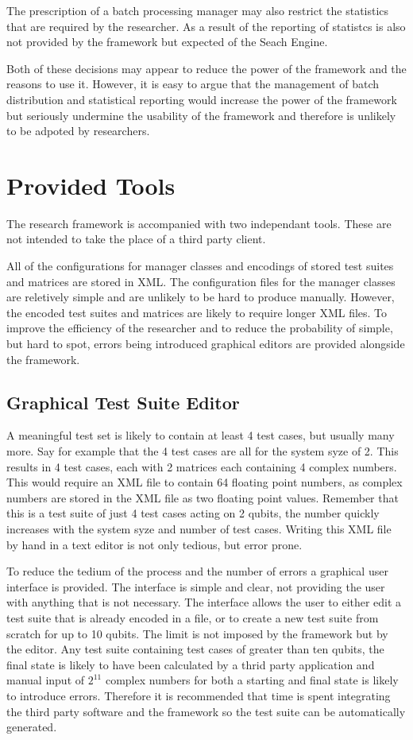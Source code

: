 The prescription of a batch processing manager may also restrict the statistics that are required by the researcher.
As a result of the reporting of statistcs is also not provided by the framework but expected of the Seach Engine.

Both of these decisions may appear to reduce the power of the framework and the reasons to use it.
However, it is easy to argue that the management of batch distribution and statistical reporting would increase the power of the framework but seriously undermine the usability of the framework and therefore is unlikely to be adpoted by researchers.

\section{Provided Tools}
The research framework is accompanied with two independant tools.
These are not intended to take the place of a third party client.

All of the configurations for manager classes and encodings of stored test suites and matrices are stored in XML.
The configuration files for the manager classes are reletively simple and are unlikely to be hard to produce manually.
However, the encoded test suites and matrices are likely to require longer XML files.
To improve the efficiency of the researcher and to reduce the probability of simple, but hard to spot, errors being introduced graphical editors are provided alongside the framework.

\subsection{Graphical Test Suite Editor}
\label{sec:indtestsuiteeditor}
A meaningful test set is likely to contain at least 4 test cases, but usually many more.
Say for example that the 4 test cases are all for the system syze of 2.
This results in 4 test cases, each with 2 matrices each containing 4 complex numbers.
This would require an XML file to contain 64 floating point numbers, as complex numbers are stored in the XML file as two floating point values.
Remember that this is a test suite of just 4 test cases acting on 2 qubits, the number quickly increases with the system syze and number of test cases.
Writing this XML file by hand in a text editor is not only tedious, but error prone.

To reduce the tedium of the process and the number of errors a graphical user interface is provided.
The interface is simple and clear, not providing the user with anything that is not necessary.
The interface allows the user to either edit a test suite that is already encoded in a file, or to create a new test suite from scratch for up to 10 qubits.
The limit is not imposed by the framework but by the editor.
Any test suite containing test cases of greater than ten qubits, the final state is likely to have been calculated by a thrid party application and manual input of $2^{11}$ complex numbers for both a starting and final state is likely to introduce errors.
Therefore it is recommended that time is spent integrating the third party software and the framework so the test suite can be automatically generated.

